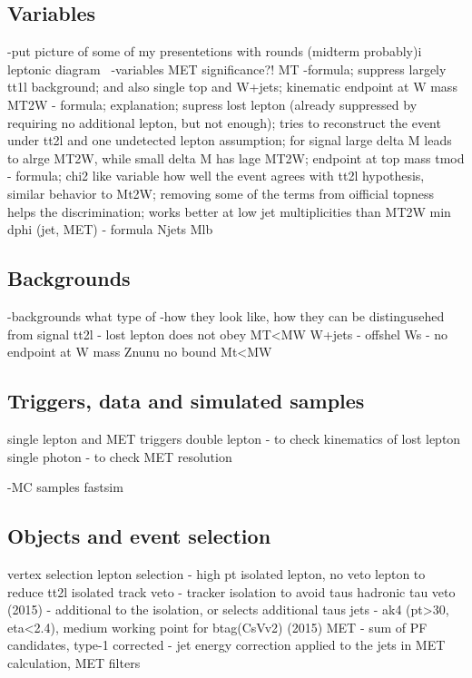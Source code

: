 \subsection{Variables}
-put picture of some of my presentetions with rounds (midterm probably)i
leptonic diagram~\cite{CMS:2016vew}
-variables
	MET significance?!
	MT -formula; suppress largely tt1l background; and also single top and W+jets; kinematic endpoint at W mass
	MT2W - formula; explanation; supress lost lepton (already suppressed by requiring no additional lepton, but not enough); tries to reconstruct the event under tt2l and one undetected lepton assumption; for signal large delta M leads to alrge MT2W, while small delta M has lage MT2W; endpoint at top mass
	tmod - formula; chi2 like variable how well the event agrees with tt2l hypothesis, similar behavior to Mt2W; removing some of the terms from oifficial topness helps the discrimination; works better at low jet multiplicities than MT2W
	min dphi (jet, MET) - formula
        Njets
	Mlb

\subsection{Backgrounds}
-backgrounds 
	what type of
-how they look like, how they can be distingusehed from signal
	tt2l - lost lepton does not obey MT<MW
	W+jets - offshel Ws - no endpoint at W mass
	Znunu no bound Mt<MW

\subsection{Triggers, data and simulated samples}

	single lepton and MET triggers
	double lepton - to check kinematics of lost lepton
	single photon - to check MET resolution

-MC samples
	fastsim

\subsection{Objects and event selection}
	vertex selection 
	lepton selection - high pt isolated lepton, no veto lepton to reduce tt2l
	isolated track veto - tracker isolation to avoid taus
	hadronic tau veto (2015) - additional to the isolation, or selects additional taus
	jets - ak4 (pt>30, eta<2.4), medium working point for btag(CsVv2) (2015)
	MET - sum of PF candidates, type-1 corrected - jet energy correction applied to the jets in MET calculation, MET filters


